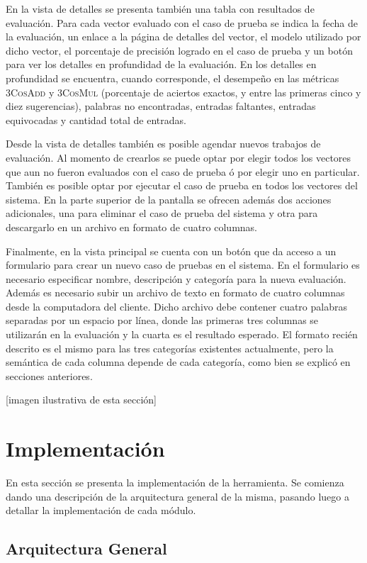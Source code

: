 En la vista de detalles se presenta también una tabla con resultados de evaluación. Para cada vector
evaluado con el caso de prueba se indica la fecha de la evaluación, un enlace a la página de detalles del
vector, el modelo utilizado por dicho vector, el porcentaje de precisión logrado en el caso de prueba y
un botón para ver los detalles en profundidad de la evaluación. En los detalles en profundidad se
encuentra, cuando corresponde, el desempeño en las métricas \textsc{3CosAdd} y \textsc{3CosMul}
(porcentaje de aciertos exactos, y entre las primeras cinco y diez sugerencias), palabras no encontradas,
entradas faltantes, entradas equivocadas y cantidad total de entradas.

Desde la vista de detalles también es posible agendar nuevos trabajos de evaluación. Al momento de
crearlos se puede optar por elegir todos los vectores que aun no fueron evaluados con el caso de prueba
ó por elegir uno en particular. También es posible optar por ejecutar el caso de prueba en todos los
vectores del sistema. En la parte superior de la pantalla se ofrecen además dos acciones adicionales,
una para eliminar el caso de prueba del sistema y otra para descargarlo en un archivo en formato de
cuatro columnas.

Finalmente, en la vista principal se cuenta con un botón que da acceso a un formulario para crear un
nuevo caso de pruebas en el sistema. En el formulario es necesario especificar nombre, descripción y
categoría para la nueva evaluación. Además es necesario subir un archivo de texto en formato de cuatro
columnas desde la computadora del cliente. Dicho archivo debe contener cuatro palabras separadas por un
espacio por línea, donde las primeras tres columnas se utilizarán en la evaluación y la cuarta es el
resultado esperado. El formato recién descrito es el mismo para las tres categorías existentes
actualmente, pero la semántica de cada columna depende de cada categoría, como bien se explicó en
secciones anteriores.

[imagen ilustrativa de esta sección]


\section{Implementación}

En esta sección se presenta la implementación de la herramienta. Se comienza dando una descripción
de la arquitectura general de la misma, pasando luego a detallar la implementación de cada
módulo.


\subsection{Arquitectura General}

